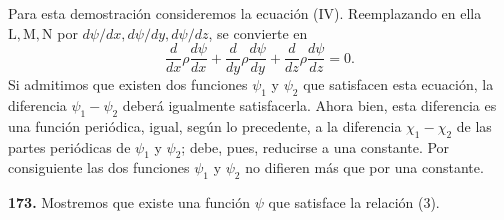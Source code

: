 Para esta demostración consideremos la ecuación (IV). Reemplazando en
ella $\mathrm L,\mathrm M,\mathrm N$ por $d\psi/dx,d\psi/dy,d\psi/dz$, se
convierte en
\begin{equation}
\frac{d}{dx}\rho\frac{d\psi}{dx}+\frac{d}{dy}\rho\frac{d\psi}{dy}+\frac{d}{dz}\rho\frac{d\psi}{dz}=0.
\tag{3}
\end{equation}
Si admitimos que existen dos funciones $\psi_1$ y $\psi_2$ que satisfacen
esta ecuación, la diferencia $\psi_1-\psi_2$ deberá igualmente satisfacerla.
Ahora bien, esta diferencia es una función periódica, igual, según lo
precedente, a la diferencia $\chi_1-\chi_2$ de las partes periódicas de
$\psi_1$ y $\psi_2$; debe, pues, reducirse a una constante. Por
consiguiente las dos funciones $\psi_1$ y $\psi_2$ no difieren más que por
una constante.

\noindent\textbf{173.} Mostremos que existe una función $\psi$ que satisface la relación (3).

